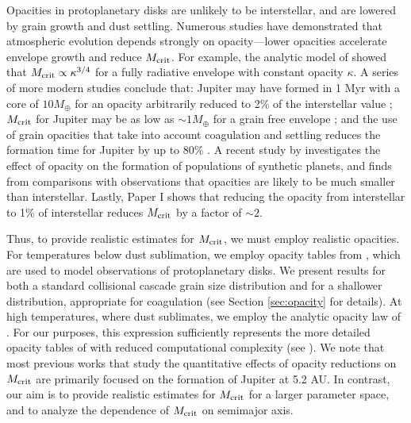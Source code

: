 Opacities in protoplanetary disks are unlikely to be interstellar, and are lowered by grain growth and dust settling.  Numerous studies have demonstrated that atmospheric evolution depends strongly on opacity---lower opacities accelerate envelope growth and reduce $M_{\rm crit}$.  For example, the analytic model of \citet{stevenson82} showed that $M_{\rm crit} \propto \kappa^{3/4}$ for a fully radiative envelope with constant opacity $\kappa$. A series of more modern studies conclude that: Jupiter may have formed in 1 Myr with a core of $10 M_{\oplus}$ for an opacity arbitrarily reduced to 2\% of the interstellar value \citep{hubickyj05};  $M_{\rm crit}$ for Jupiter may be as low as $\sim$$1 M_{\oplus}$ for a grain free envelope \citep{hori10}; and the use of grain opacities that take into account coagulation and settling reduces the formation time for Jupiter by up to 80\%  \citep{movshovitz10}. A recent study by \citet{mordasini14} investigates the effect of opacity on the formation of populations of synthetic planets, and finds from comparisons with observations that opacities are likely to be much smaller than interstellar. Lastly, Paper I shows that reducing the opacity from interstellar to 1\% of interstellar reduces $M_{\rm crit}$ by a factor of $\sim$$2$. 


Thus, to provide realistic estimates for $M_{\rm crit}$, we must employ realistic opacities.    For temperatures below dust sublimation, we employ opacity tables from \citet{dalessio01}, which are used to model observations of protoplanetary disks.  We present results for both a standard collisional cascade grain size distribution and for a shallower distribution, appropriate for coagulation (see Section \ref{sec:opacity} for details).  At high temperatures, where dust sublimates, we employ the analytic opacity law of \citet{bell94}.  For our purposes, this expression sufficiently represents the more detailed opacity tables of \citet{semenov03} with reduced computational complexity (see ).  
We note that most previous works that study the quantitative effects of opacity reductions on $M_{\rm crit}$ are primarily focused on the formation of Jupiter at 5.2 AU.  In contrast,
our aim is to provide realistic estimates for $M_{\rm crit}$ for a larger parameter space, and to analyze the dependence of $M_{\rm crit}$ on semimajor axis.




